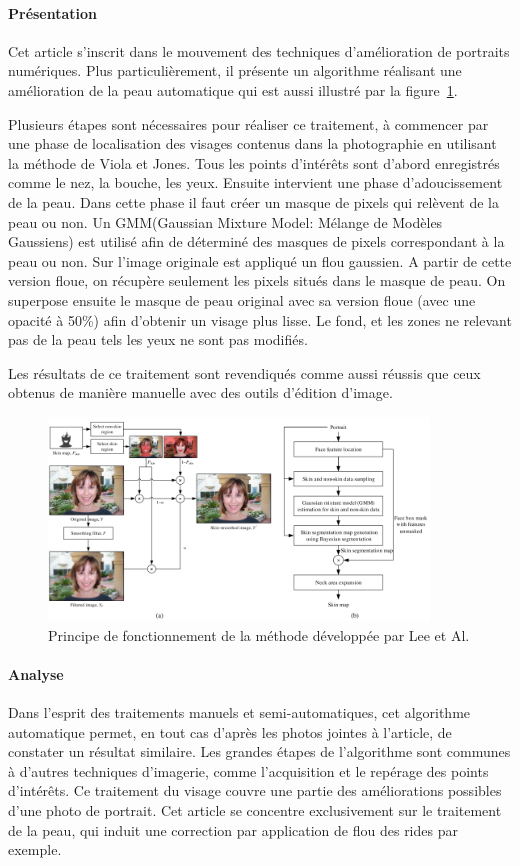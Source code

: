 \documentclass[11pt, french]{report-rd-info}
\begin{document}
\paragraph{Présentation}
Cet article s'inscrit dans le mouvement des techniques d'amélioration de portraits numériques.
Plus particulièrement, il présente un algorithme réalisant une amélioration de la peau automatique qui est aussi illustré par la figure~\ref{fig:FonctionnementLee}.

Plusieurs étapes sont nécessaires pour réaliser ce traitement, à commencer par une phase de localisation des visages contenus dans la photographie en utilisant la méthode de Viola et Jones.
Tous les points d'intérêts sont d'abord enregistrés comme le nez, la bouche, les yeux.
Ensuite intervient une phase d'adoucissement de la peau.
Dans cette phase il faut créer un masque de pixels qui relèvent de la peau ou non.
Un GMM(Gaussian Mixture Model: Mélange de Modèles Gaussiens) est utilisé afin de déterminé des masques de pixels correspondant à la peau ou non.
Sur l’image originale est appliqué un flou gaussien. A partir de cette version floue, on récupère seulement les pixels situés dans le masque de peau. On superpose ensuite le masque de peau original avec sa version floue (avec une opacité à 50\%) afin d’obtenir un visage plus lisse. Le fond, et les zones ne relevant pas de la peau tels les yeux ne sont pas modifiés.

Les résultats de ce traitement sont revendiqués comme aussi réussis que ceux obtenus de manière manuelle avec des outils d'édition d'image.
\begin{figure}
	\centering
\includegraphics[width=0.9\textwidth]{Images/ea_algo_smoothing}
	\caption{Principe de fonctionnement de la méthode développée par Lee et Al.\cite{Lee}}
	\label{fig:FonctionnementLee}
\end{figure}
\paragraph{Analyse}
Dans l'esprit des traitements manuels et semi-automatiques, cet algorithme automatique permet, en tout cas d'après les photos jointes à l'article, de constater un résultat similaire.
Les grandes étapes de l'algorithme sont communes à d'autres techniques d'imagerie, comme l'acquisition et le repérage des points d'intérêts.
Ce traitement du visage couvre une partie des améliorations possibles d'une photo de portrait. Cet article se concentre exclusivement sur le traitement de la peau, qui induit une correction par application de flou des rides par exemple.
\end{document}
